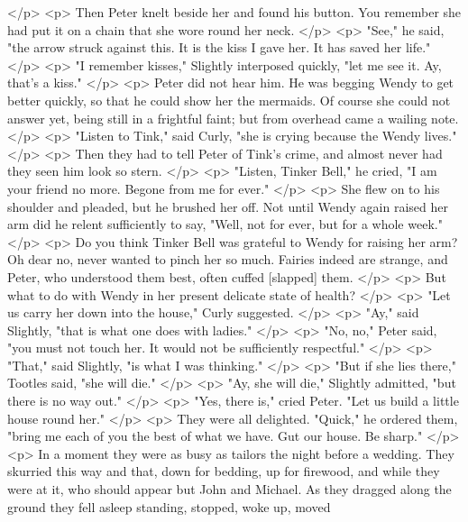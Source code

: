     </p>
    <p>
      Then Peter knelt beside her and found his button. You remember she had put
      it on a chain that she wore round her neck.
    </p>
    <p>
      "See," he said, "the arrow struck against this. It is the kiss I gave her.
      It has saved her life."
    </p>
    <p>
      "I remember kisses," Slightly interposed quickly, "let me see it. Ay,
      that's a kiss."
    </p>
    <p>
      Peter did not hear him. He was begging Wendy to get better quickly, so
      that he could show her the mermaids. Of course she could not answer yet,
      being still in a frightful faint; but from overhead came a wailing note.
    </p>
    <p>
      "Listen to Tink," said Curly, "she is crying because the Wendy lives."
    </p>
    <p>
      Then they had to tell Peter of Tink's crime, and almost never had they
      seen him look so stern.
    </p>
    <p>
      "Listen, Tinker Bell," he cried, "I am your friend no more. Begone from me
      for ever."
    </p>
    <p>
      She flew on to his shoulder and pleaded, but he brushed her off. Not until
      Wendy again raised her arm did he relent sufficiently to say, "Well, not
      for ever, but for a whole week."
    </p>
    <p>
      Do you think Tinker Bell was grateful to Wendy for raising her arm? Oh
      dear no, never wanted to pinch her so much. Fairies indeed are strange,
      and Peter, who understood them best, often cuffed [slapped] them.
    </p>
    <p>
      But what to do with Wendy in her present delicate state of health?
    </p>
    <p>
      "Let us carry her down into the house," Curly suggested.
    </p>
    <p>
      "Ay," said Slightly, "that is what one does with ladies."
    </p>
    <p>
      "No, no," Peter said, "you must not touch her. It would not be
      sufficiently respectful."
    </p>
    <p>
      "That," said Slightly, "is what I was thinking."
    </p>
    <p>
      "But if she lies there," Tootles said, "she will die."
    </p>
    <p>
      "Ay, she will die," Slightly admitted, "but there is no way out."
    </p>
    <p>
      "Yes, there is," cried Peter. "Let us build a little house round her."
    </p>
    <p>
      They were all delighted. "Quick," he ordered them, "bring me each of you
      the best of what we have. Gut our house. Be sharp."
    </p>
    <p>
      In a moment they were as busy as tailors the night before a wedding. They
      skurried this way and that, down for bedding, up for firewood, and while
      they were at it, who should appear but John and Michael. As they dragged
      along the ground they fell asleep standing, stopped, woke up, moved
